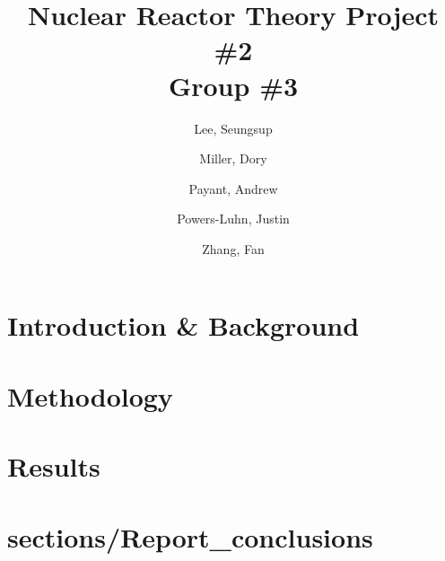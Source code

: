 \documentclass[10pt,peerreviewca]{IEEEtran}
\author{
	Lee, Seungsup
	\and
	Miller, Dory
	\and
	Payant, Andrew
	\and
	Powers-Luhn, Justin
	\and
	Zhang, Fan
}
\title{Nuclear Reactor Theory Project \#2\\Group \#3}
\date{ }
\begin{document}
\maketitle

\section{Introduction \& Background}



\section{Methodology}



\section{Results}



\section{sections/Report_conclusions}
\end{document}
